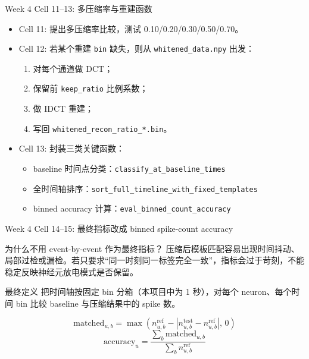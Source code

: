 \documentclass[aspectratio=169,11pt]{beamer}
\begin{document}
\begin{frame}{Week 4 Cell 11--13: 多压缩率与重建函数}
  \begin{itemize}
    \item Cell 11: 提出多压缩率比较，测试 0.10/0.20/0.30/0.50/0.70。
    \item Cell 12: 若某个重建 \texttt{bin} 缺失，则从 \texttt{whitened\_data.npy} 出发：
    \begin{enumerate}
      \item 对每个通道做 DCT；
      \item 保留前 \texttt{keep\_ratio} 比例系数；
      \item 做 IDCT 重建；
      \item 写回 \texttt{whitened\_recon\_ratio\_*.bin}。
    \end{enumerate}
    \item Cell 13: 封装三类关键函数：
    \begin{itemize}
      \item baseline 时间点分类：\texttt{classify\_at\_baseline\_times}
      \item 全时间轴排序：\texttt{sort\_full\_timeline\_with\_fixed\_templates}
      \item binned accuracy 计算：\texttt{eval\_binned\_count\_accuracy}
    \end{itemize}
  \end{itemize}
\end{frame}

\begin{frame}{Week 4 Cell 14--15: 最终指标改成 binned spike-count accuracy}
  \begin{block}{为什么不用 event-by-event 作为最终指标？}
    压缩后模板匹配容易出现时间抖动、局部过检或漏检。若只要求“同一时刻同一标签完全一致”，指标会过于苛刻，不能稳定反映神经元放电模式是否保留。
  \end{block}
  \begin{block}{最终定义}
    把时间轴按固定 bin 分箱（本项目中为 1 秒），对每个 neuron、每个时间 bin 比较 baseline 与压缩结果中的 spike 数。
  \end{block}
  \[
    \text{matched}_{u,b}=\max\left(n^{\text{ref}}_{u,b}-\left|n^{\text{test}}_{u,b}-n^{\text{ref}}_{u,b}\right|,\,0\right)
  \]
  \[
    \text{accuracy}_{u}=\frac{\sum_b \text{matched}_{u,b}}{\sum_b n^{\text{ref}}_{u,b}}
  \]
\end{frame}
\end{document}
